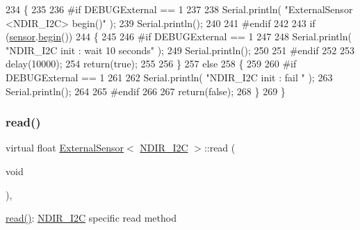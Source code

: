 \begin{DoxyCode}
234     \{
235     
236 \textcolor{preprocessor}{    #if DEBUGExternal == 1 }
237 
238         Serial.println( \textcolor{stringliteral}{"ExternalSensor <NDIR\_I2C> begin()"} );
239         Serial.println();
240     
241 \textcolor{preprocessor}{    #endif }
242 
243         \textcolor{keywordflow}{if} (\hyperlink{class_external_sensor_3_01_n_d_i_r___i2_c_01_4_ae541c9cece7c38674b70114cdb74a7dc}{sensor}.\hyperlink{class_n_d_i_r___i2_c_acf82f3dcb41e75709a93f8b68d087a3c}{begin}()) 
244         \{
245         
246 \textcolor{preprocessor}{        #if DEBUGExternal == 1 }
247             
248             Serial.println( \textcolor{stringliteral}{"NDIR\_I2C init : wait 10 seconds"} );
249             Serial.println();
250         
251 \textcolor{preprocessor}{        #endif}
252 
253             delay(10000);
254             \textcolor{keywordflow}{return}(\textcolor{keyword}{true});
255 
256             \}
257         \textcolor{keywordflow}{else} 
258         \{
259         
260 \textcolor{preprocessor}{        #if DEBUGExternal == 1 }
261 
262             Serial.println( \textcolor{stringliteral}{"NDIR\_I2C init : fail "} );
263             Serial.println();
264         
265 \textcolor{preprocessor}{        #endif}
266 
267             \textcolor{keywordflow}{return}(\textcolor{keyword}{false});
268         \}   
269     \}
\end{DoxyCode}
\mbox{\label{class_external_sensor_3_01_n_d_i_r___i2_c_01_4_a239d18652e9fb4673842ae9726edf44f}} 
\subsubsection{\texorpdfstring{read()}{read()}}
{\footnotesize\ttfamily virtual float \hyperlink{class_external_sensor}{External\+Sensor}$<$ \hyperlink{class_n_d_i_r___i2_c}{N\+D\+I\+R\+\_\+\+I2C} $>$\+::read (\begin{DoxyParamCaption}\item[{void}]{ }\end{DoxyParamCaption})\hspace{0.3cm}{\ttfamily [inline]}, {\ttfamily [virtual]}}

\hyperlink{class_external_sensor_3_01_n_d_i_r___i2_c_01_4_a239d18652e9fb4673842ae9726edf44f}{read()}\+: \hyperlink{class_n_d_i_r___i2_c}{N\+D\+I\+R\+\_\+\+I2C} specific read method

